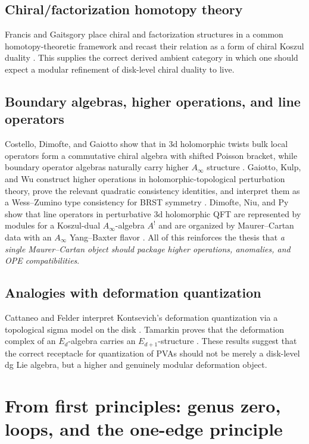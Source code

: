 \subsection{Chiral/factorization homotopy theory}

Francis and Gaitsgory place chiral and factorization structures in a common homotopy-theoretic
framework and recast their relation as a form of chiral Koszul duality
\cite{FG12}. This supplies the correct derived ambient category in which
one should expect a modular refinement of disk-level chiral duality to live.

\subsection{Boundary algebras, higher operations, and line operators}

Costello, Dimofte, and Gaiotto show that in 3d holomorphic twists bulk local operators form
a commutative chiral algebra with shifted Poisson bracket, while boundary operator algebras
naturally carry higher $A_\infty$ structure \cite{CDG20}. Gaiotto,
Kulp, and Wu construct higher operations in holomorphic-topological perturbation theory,
prove the relevant quadratic consistency identities, and interpret them as a Wess--Zumino
type consistency for BRST symmetry \cite{GKW25}. Dimofte, Niu, and Py show
that line operators in perturbative 3d holomorphic QFT are represented by modules for a
Koszul-dual $A_\infty$-algebra $A^!$ and are organized by Maurer--Cartan data with an
$A_\infty$ Yang--Baxter flavor \cite{DNP25}. All of this reinforces the thesis
that \emph{a single Maurer--Cartan object should package higher operations, anomalies,
and OPE compatibilities}. 

\subsection{Analogies with deformation quantization}

Cattaneo and Felder interpret Kontsevich's deformation quantization via a topological
sigma model on the disk \cite{CF00}. Tamarkin proves that the deformation
complex of an $E_d$-algebra carries an $E_{d+1}$-structure \cite{Tam02}. These
results suggest that the correct receptacle for quantization of PVAs should not be merely
a disk-level dg Lie algebra, but a higher and genuinely modular deformation object.

\section{From first principles: genus zero, loops, and the one-edge principle}

